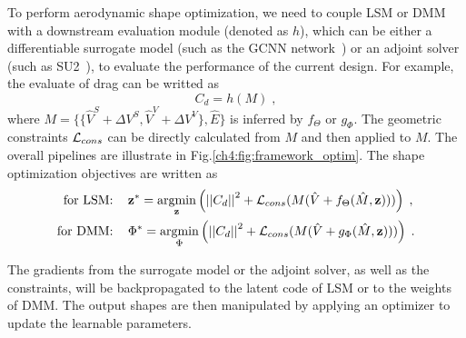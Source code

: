 To perform aerodynamic shape optimization, we need to couple LSM or DMM with a downstream evaluation module (denoted as $h$), which can be either a differentiable surrogate model (such as the GCNN network~\cite{aa.Baque2018}) or an adjoint solver (such as SU2~\cite{aa.Economon2016}), to evaluate the performance of the current design. For example, the evaluate of drag can be writted as
\begin{equation}
    C_d = h(M)\;,
\end{equation}
where $M=\{\{\hat{V}^S+\Delta V^S, \hat{V}^V+\Delta V^V\}, \hat{E}\}$ is inferred by $f_{\Theta}$ or $g_{\Phi}$.
The geometric constraints $\mathcal{L}_{cons}$ can be directly calculated from $M$ and then applied to $M$. The overall pipelines are illustrate in Fig.\ref{ch4:fig:framework_optim}. The shape optimization objectives are written as
\begin{align}
    \text{for LSM: }&\;\;\; \bz^* =   \argmin_{\bz} \left( \left|\left|C_d\right|\right|^2 + \cL_{cons}(M(\hat{V} + f_{\Theta}(\hat{M},\bz))) \right)\; ,\\
    \text{for DMM: }&\;\;\;  \Phi^* =   \argmin_{\Phi} \left( \left|\left|C_d\right|\right|^2 + \cL_{cons}(M(\hat{V} + g_{\Phi}(\hat{M},\bz))) \right)\; .
\end{align}

The gradients from the surrogate model or the adjoint solver, as well as the constraints, will be backpropagated to the latent code of LSM or to the weights of DMM. The output shapes are then manipulated by applying an optimizer to update the learnable parameters.